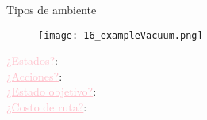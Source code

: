 
\begin{frame}{Tipos de ambiente}
        \begin{figure}\texttt{[image: 16\_exampleVacuum.png]}\end{figure}
        \small{
            \textcolor{Pink}{\underline{¿Estados?}}:\\
            \textcolor{Pink}{\underline{¿Acciones?}}:\\
            \textcolor{Pink}{\underline{¿Estado objetivo?}}:\\
            \textcolor{Pink}{\underline{¿Costo de ruta?}}: 
        }
        \break\break\break\break\break
\end{frame}